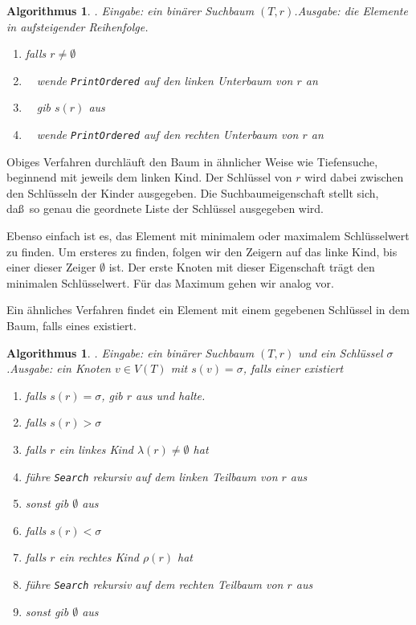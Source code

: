 \documentclass[10pt,reqno]{amsart}
\numberwithin{equation}{section}
\newtheorem{algorithm}[definition]{Algorithmus}
\begin{document}
\begin{algorithm}. {\em Eingabe:} ein bin\"arer Suchbaum $(T,r)$.\label{alg_print}
	{\em Ausgabe:} die Elemente in aufsteigender Reihenfolge.
	\begin{enumerate}
		\item falls $r\neq\emptyset$
		\item $\quad$wende {\tt PrintOrdered} auf den linken Unterbaum von $r$ an
		\item $\quad$gib $s(r)$ aus
		\item $\quad$wende {\tt PrintOrdered} auf den rechten Unterbaum von $r$ an
	\end{enumerate}
\end{algorithm}

Obiges Verfahren durchl\"auft den Baum in \"ahnlicher Weise wie Tiefensuche, beginnend mit jeweils dem linken Kind.
Der Schl\"ussel von $r$ wird dabei zwischen den Schl\"usseln der Kinder ausgegeben.
Die Suchbaumeigenschaft stellt sich, da\ss\ so genau die geordnete Liste der Schl\"ussel ausgegeben wird.

Ebenso einfach ist es, das Element mit minimalem oder maximalem Schl\"usselwert zu finden.
Um ersteres zu finden, folgen wir den Zeigern auf das linke Kind, bis einer dieser Zeiger $\emptyset$ ist.
Der erste Knoten mit dieser Eigenschaft tr\"agt den minimalen Schl\"usselwert.
F\"ur das Maximum gehen wir analog vor.

Ein \"ahnliches Verfahren findet ein Element mit einem gegebenen Schl\"ussel in dem Baum, falls eines existiert.

\begin{algorithm}. {\em Eingabe:} ein bin\"arer Suchbaum $(T,r)$ und ein Schl\"ussel $\sigma$.\label{alg_print}
	{\em Ausgabe:} ein Knoten $v\in V(T)$ mit $s(v)=\sigma$, falls einer existiert
	\begin{enumerate}
		\item falls $s(r)=\sigma$, gib $r$ aus und halte.
		\item falls $s(r)>\sigma$
		\item \quad falls $r$ ein linkes Kind $\lambda(r)\neq\emptyset$ hat
		\item \qquad f\"uhre {\tt Search} rekursiv auf dem linken Teilbaum von $r$ aus
		\item \quad sonst gib $\emptyset$ aus
		\item falls $s(r)<\sigma$
		\item \quad falls $r$ ein rechtes Kind $\rho(r)$ hat
		\item \qquad f\"uhre {\tt Search} rekursiv auf dem rechten Teilbaum von $r$ aus
		\item \quad sonst gib $\emptyset$ aus
	\end{enumerate}
\end{algorithm}
\end{document}
